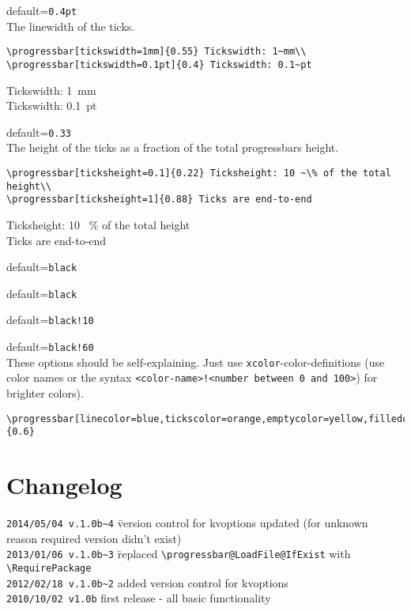 \documentclass{ltxdoc}
\begin{document}
 default=\texttt{0.4pt}\\
	The linewidth of the ticks.
\begin{lstlisting}
\progressbar[tickswidth=1mm]{0.55} Tickswidth: 1~mm\\
\progressbar[tickswidth=0.1pt]{0.4} Tickswidth: 0.1~pt
\end{lstlisting}
	 Tickswidth: 1~mm\\
	 Tickswidth: 0.1~pt

 default=\texttt{0.33}\\
	The height of the ticks as a fraction of the total progressbars height.
\begin{lstlisting}
\progressbar[ticksheight=0.1]{0.22} Ticksheight: 10 ~\% of the total height\\
\progressbar[ticksheight=1]{0.88} Ticks are end-to-end
\end{lstlisting}
	 Ticksheight: 10 ~\% of the total height\\
	 Ticks are end-to-end

 default=\texttt{black}

 default=\texttt{black}

 default=\texttt{black!10}

 default=\texttt{black!60}\\
These options should be self-explaining. Just use \texttt{xcolor}-color-definitions (use color names or the syntax \lstinline+<color-name>!<number between 0 and 100>+) for brighter colors).
\begin{lstlisting}
\progressbar[linecolor=blue,tickscolor=orange,emptycolor=yellow,filledcolor=red]{0.6}
\end{lstlisting}

\section{Changelog}
\begin{tabbing}
\texttt{2014/05/04 v.1.0b\~{}4} \= version control for kvoptions updated (for unknown\\ \>
reason required version didn't exist)\\
\texttt{2013/01/06 v.1.0b\~{}3} \= replaced \lstinline+\progressbar@LoadFile@IfExist+ with\\ \> \lstinline+\RequirePackage+\\
\texttt{2012/02/18 v.1.0b\~{}2} \> added version control for kvoptions\\
\texttt{2010/10/02 v1.0b} \> first release - all basic functionality
\end{tabbing}
\end{document}
